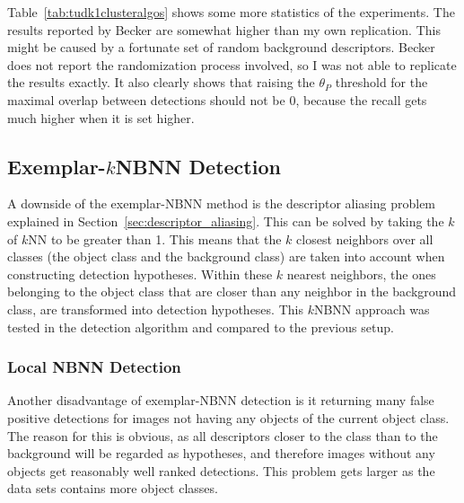 Table~\ref{tab:tudk1clusteralgos} shows some more statistics of the experiments. The results reported by Becker are somewhat higher than my own replication. This might be caused by a fortunate set of random background descriptors. Becker does not report the randomization process involved, so I was not able to replicate the results exactly. It also clearly shows that raising the $\theta_P$ threshold for the maximal overlap between detections should not be 0, because the recall gets much higher when it is set higher.



\begin{figure}[hbt]
    \centering
\end{figure}


\begin{table}[hbt]
    \centering
\end{table}


\subsection{Exemplar-$k$NBNN Detection} %
\label{sec:local_nbnn_detection}
A downside of the exemplar-NBNN method is the descriptor aliasing problem explained in Section~\ref{sec:descriptor_aliasing}. This can be solved by taking the $k$ of $k$NN to be greater than 1. This means that the $k$ closest neighbors over all classes (the object class and the background class) are taken into account when constructing detection hypotheses. Within these $k$ nearest neighbors, the ones belonging to the object class that are closer than any neighbor in the background class, are transformed into detection hypotheses. This $k$NBNN approach was tested in the detection algorithm and compared to the previous setup.

\subsubsection{Local NBNN Detection} %
\label{ssub:local_nbnn_detection}

Another disadvantage of exemplar-NBNN detection is it returning many false positive detections for images not having any objects of the current object class. The reason for this is obvious, as all descriptors closer to the class than to the background will be regarded as hypotheses, and therefore images without any objects get reasonably well ranked detections. This problem gets larger as the data sets contains more object classes.

